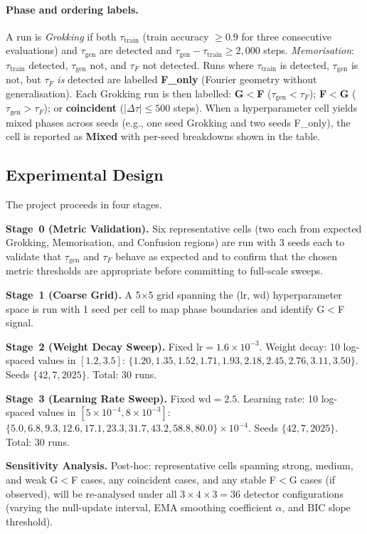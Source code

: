 \documentclass[12pt,openany,a4paper]{book}
\newcommand{\taug}{\tau_{\mathrm{gen}}}
\newcommand{\tauf}{\tau_{F}}
\newcommand{\Dtau}{\Delta\tau}
\begin{document}
\paragraph{Phase and ordering labels.}
A run is \textit{Grokking} if both $\tau_{\mathrm{train}}$
(train accuracy $\geq0.9$ for three consecutive evaluations)
and $\taug$ are detected and $\taug - \tau_{\mathrm{train}}
\geq 2{,}000$ steps.
\textit{Memorisation}: $\tau_{\mathrm{train}}$ detected, $\taug$ not,
and $\tauf$ not detected.
Runs where $\tau_{\mathrm{train}}$ is detected, $\taug$ is not, but
$\tauf$ \emph{is} detected are labelled \textbf{F\_only} (Fourier
geometry without generalisation).
Each Grokking run is then labelled:
\textbf{G$<$F} ($\taug < \tauf$);
\textbf{F$<$G} ($\taug > \tauf$);
or \textbf{coincident} ($|\Dtau| \leq 500$ steps).
When a hyperparameter cell yields mixed phases across seeds (e.g.,
one seed Grokking and two seeds F\_only), the cell is reported as
\textbf{Mixed} with per-seed breakdowns shown in the table.

\subsection{Experimental Design}

The project proceeds in four stages.

\textbf{Stage~0 (Metric Validation).}
Six representative cells (two each from expected Grokking,
Memorisation, and Confusion regions) are run with 3 seeds each
to validate that $\taug$ and $\tauf$ behave as expected and to
confirm that the chosen metric thresholds are appropriate before
committing to full-scale sweeps.

\textbf{Stage~1 (Coarse Grid).}
A 5$\times$5 grid spanning the ($\mathrm{lr}$, $\mathrm{wd}$)
hyperparameter space is run with 1 seed per cell to map phase
boundaries and identify G$<$F signal.

\textbf{Stage~2 (Weight Decay Sweep).}
Fixed $\mathrm{lr} = 1.6\times10^{-3}$.
Weight decay: 10 log-spaced values in $[1.2, 3.5]$:
$\{1.20, 1.35, 1.52, 1.71, 1.93, 2.18, 2.45, 2.76, 3.11, 3.50\}$.
Seeds $\{42, 7, 2025\}$. Total: 30 runs.

\textbf{Stage~3 (Learning Rate Sweep).}
Fixed $\mathrm{wd} = 2.5$.
Learning rate: 10 log-spaced values in $[5\times10^{-4}, 8\times10^{-3}]$:
$\{5.0, 6.8, 9.3, 12.6, 17.1, 23.3, 31.7, 43.2, 58.8, 80.0\}
\times 10^{-4}$.
Seeds $\{42, 7, 2025\}$. Total: 30 runs.

\textbf{Sensitivity Analysis.}
Post-hoc: representative cells spanning strong, medium, and weak
G$<$F cases, any coincident cases, and any stable F$<$G cases
(if observed), will be re-analysed under all $3\times4\times3 = 36$
detector configurations (varying the null-update interval, EMA
smoothing coefficient $\alpha$, and BIC slope threshold).
\end{document}
